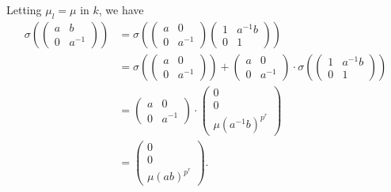 											Letting $\mu_l = \mu$ in $k$, we have
											\begin{align*}
	\sigma\left(
			\left(\begin{matrix} a & b \\ 0 & a^{-1}\end{matrix}\right)
			\right) &=
	\sigma\left(
			\left(\begin{matrix} a & 0 \\ 0 & a^{-1}\end{matrix}\right)
			\left(\begin{matrix} 1 & a^{-1}b \\ 0 & 1\end{matrix}\right)
			\right) \\
		&=
	\sigma\left(
			\left(\begin{matrix} a & 0 \\ 0 & a^{-1}\end{matrix}\right)
			\right) +
	\left(\begin{matrix} a & 0 \\ 0 & a^{-1}\end{matrix}\right) \cdot
	\sigma\left(
			\left(\begin{matrix} 1 & a^{-1}b \\ 0 & 1\end{matrix}\right)
			\right) \\
		&=
		\left(\begin{matrix} a & 0 \\ 0 & a^{-1}\end{matrix}\right) \cdot
		\left(\begin{matrix} 0 \\ 0 \\ \mu(a^{-1}b)^{p^{r}}\end{matrix}\right) \\
			&=
			\left(\begin{matrix} 0 \\ 0 \\ \mu(ab)^{p^{r}}\end{matrix}\right).
			\end{align*}

